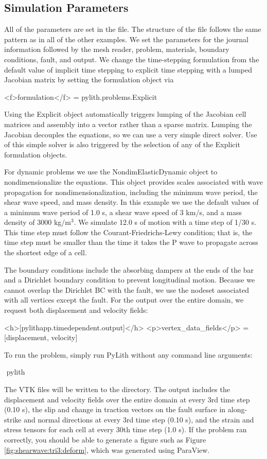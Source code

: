 \subsection{Simulation Parameters}

All of the parameters are set in the  file.
The structure of the file follows the same pattern as in all of the
other examples. We set the parameters for the journal information
followed by the mesh reader, problem, materials, boundary conditions,
fault, and output. We change the time-stepping formulation from the
default value of implicit time stepping to explicit time stepping
with a lumped Jacobian matrix by setting the formulation object via
\begin{cfg}
<f>formulation</f> = pylith.problems.Explicit
\end{cfg}
Using the Explicit object automatically triggers lumping of the
Jacobian cell matrices and assembly into a vector rather than a sparse
matrix.  Lumping the Jacobian decouples the equations, so we can use a
very simple direct solver. Use of this simple solver is also triggered
by the selection of any of the Explicit formulation objects.

For dynamic problems we use the NondimElasticDynamic object to
nondimensionalize the equations. This object provides scales
associated with wave propagation for nondimensionalization, including
the minimum wave period, the shear wave speed, and mass density. In
this example we use the default values of a minimum wave period of 1.0
s, a shear wave speed of 3 km/s, and a mass density of 3000
kg/m$^{3}$. We simulate 12.0 s of motion with a time step of 1/30
s. This time step must follow the Courant-Friedrichs-Lewy condition;
that is, the time step must be smaller than the time it takes the P
wave to propagate across the shortest edge of a cell.

The boundary conditions include the absorbing dampers at the ends of
the bar and a Dirichlet boundary condition to prevent longitudinal
motion. Because we cannot overlap the Dirichlet BC with the fault, we
use the nodeset associated with all vertices except the fault.  For
the output over the entire domain, we request both displacement and
velocity fields:
\begin{cfg}
<h>[pylithapp.timedependent.output]</h>
<p>vertex_data_fields</p> = [displacement, velocity]
\end{cfg}
To run the problem, simply run PyLith without any command line arguments:
\begin{shell}
$$ pylith
\end{shell}
The VTK files will be written to the  directory. The
output includes the displacement and velocity fields over the entire
domain at every 3rd time step (0.10 s), the slip and change in traction
vectors on the fault surface in along-strike and normal directions
at every 3rd time step (0.10 s), and the strain and stress tensors
for each cell at every 30th time step (1.0 s). If the problem ran
correctly, you should be able to generate a figure such as Figure
\vref{fig:shearwave:tri3:deform}, which was generated using ParaView.

